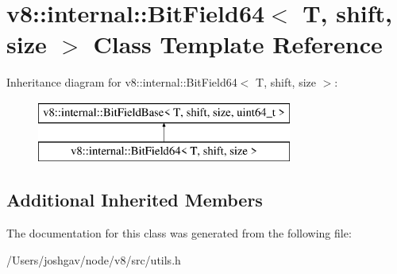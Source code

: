 \hypertarget{classv8_1_1internal_1_1_bit_field64}{}\section{v8\+:\+:internal\+:\+:Bit\+Field64$<$ T, shift, size $>$ Class Template Reference}
\label{classv8_1_1internal_1_1_bit_field64}
Inheritance diagram for v8\+:\+:internal\+:\+:Bit\+Field64$<$ T, shift, size $>$\+:\begin{figure}[H]
\begin{center}
\leavevmode
\includegraphics[height=2.000000cm]{classv8_1_1internal_1_1_bit_field64}
\end{center}
\end{figure}
\subsection*{Additional Inherited Members}


The documentation for this class was generated from the following file\+:\begin{DoxyCompactItemize}
\item 
/\+Users/joshgav/node/v8/src/utils.\+h\end{DoxyCompactItemize}
